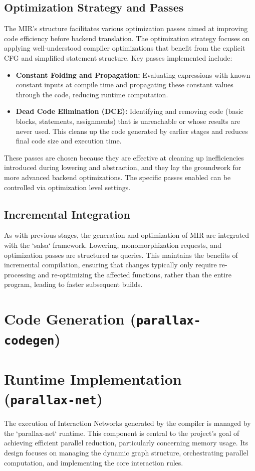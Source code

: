 \subsection{Optimization Strategy and Passes} %
The MIR's structure facilitates various optimization passes aimed at improving code efficiency before backend translation. The optimization strategy focuses on applying well-understood compiler optimizations that benefit from the explicit CFG and simplified statement structure. Key passes implemented include:
\begin{itemize}
    \item \textbf{Constant Folding and Propagation:} Evaluating expressions with known constant inputs at compile time and propagating these constant values through the code, reducing runtime computation.
    \item \textbf{Dead Code Elimination (DCE):} Identifying and removing code (basic blocks, statements, assignments) that is unreachable or whose results are never used. This cleans up the code generated by earlier stages and reduces final code size and execution time.
\end{itemize}
These passes are chosen because they are effective at cleaning up inefficiencies introduced during lowering and abstraction, and they lay the groundwork for more advanced backend optimizations. The specific passes enabled can be controlled via optimization level settings.

\subsection{Incremental Integration} %
As with previous stages, the generation and optimization of MIR are integrated with the `salsa` framework. Lowering, monomorphization requests, and optimization passes are structured as queries. This maintains the benefits of incremental compilation, ensuring that changes typically only require re-processing and re-optimizing the affected functions, rather than the entire program, leading to faster subsequent builds.

\section{Code Generation (\texttt{parallax-codegen})} %

\section{Runtime Implementation (\texttt{parallax-net})} %
The execution of Interaction Networks generated by the compiler is managed by the `parallax-net` runtime. This component is central to the project's goal of achieving efficient parallel reduction, particularly concerning memory usage. Its design focuses on managing the dynamic graph structure, orchestrating parallel computation, and implementing the core interaction rules.

